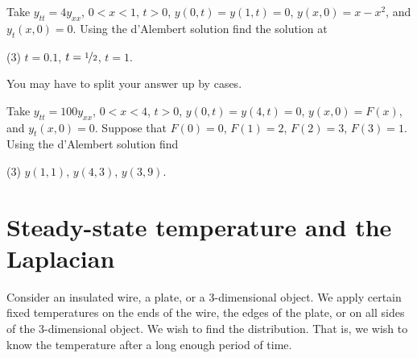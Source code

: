\begin{exercise}
Take $y_{tt} = 4y_{xx}$, $0 < x < 1$, $t > 0$,
$y(0,t) = y(1, t) = 0$, $y(x,0) = x-x^2$, and
$y_t(x,0) = 0$.  Using the d'Alembert solution find
the solution at
\begin{tasks}(3)
\task $t=0.1$,
\task $t=\nicefrac{1}{2}$,
\task $t=1$.
\end{tasks}
You may have to split your answer up by cases.
\end{exercise}

\begin{exercise}
Take $y_{tt} = 100y_{xx}$, $0 < x < 4$, $t > 0$,
$y(0,t) = y(4, t) = 0$, $y(x,0) = F(x)$, and
$y_t(x,0) = 0$.  Suppose that
$F(0)=0$,
$F(1)=2$,
$F(2)=3$,
$F(3)=1$.
Using the d'Alembert solution find
\begin{tasks}(3)
\task $y(1,1)$,
\task $y(4,3)$,
\task $y(3,9)$.
\end{tasks}
\end{exercise}


\sectionnewpage
\section{Steady-state temperature and the Laplacian}
\label{dirich:section}


Consider an insulated wire, a plate, or a 3-dimensional object.
We apply
certain fixed temperatures on the ends of the wire, the edges of the plate,
or on all sides of the 3-dimensional object.  We wish to find the
\emph{} distribution.
That is, we wish to know
the temperature after a long enough period of time.

